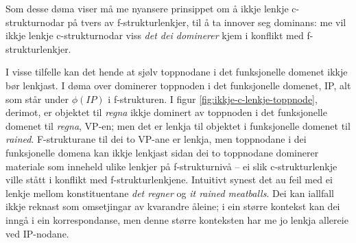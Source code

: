 \documentclass[12pt,a4paper,oneside,draft]{report}
\begin{document}
Som desse døma viser må me nyansere prinsippet om å ikkje lenkje
c-strukturnodar på tvers av f-strukturlenkjer, til å ta innover
seg dominans: me vil ikkje lenkje c-strukturnodar viss \emph{det dei dominerer} kjem i konflikt med f-strukturlenkjer.


I visse tilfelle kan det hende at sjølv toppnodane i det funksjonelle
domenet ikkje bør lenkjast. I døma over dominerer toppnoden i det
funksjonelle domenet, IP, alt som står under $\phi(IP)$ i
f-strukturen.  I figur \ref{fig:ikkje-c-lenkje-toppnode}, derimot, er
objektet til \emph{regna} ikkje dominert av toppnoden i det funksjonelle
domenet til \emph{regna}, VP-en; men det er lenkja til objektet i
funksjonelle domenet til \emph{rained}. F-strukturane til dei to VP-ane er
lenkja, men toppnodane i dei funksjonelle domena kan ikkje lenkjast
sidan dei to toppnodane dominerer materiale som inneheld ulike lenkjer
på f-strukturnivå -- ei slik c-strukturlenkje ville stått i konflikt
med f-strukturlenkjene. Intuitivt synest det au feil med ei lenkje
mellom konstituentane \emph{det regner} og \emph{it rained meatballs}. Dei kan
iallfall ikkje reknast som omsetjingar av kvarandre åleine; i ein
større kontekst kan dei inngå i ein korrespondanse, men denne større
konteksten har me jo lenkja allereie ved IP-nodane.
\end{document}
